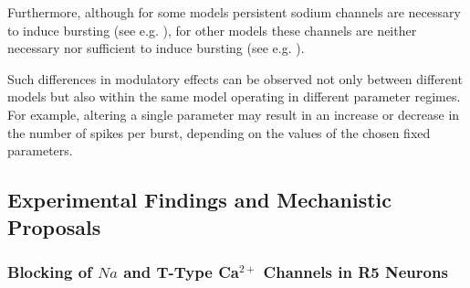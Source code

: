 \documentclass[../main.tex]{subfiles}
\begin{document}
Furthermore, although for some models persistent sodium channels are necessary to induce bursting (see e.g. \parencite{liuMultipleConductancesCooperatively2008,wangMultipleDynamicalModes1994}), for other models these channels are neither necessary nor sufficient to induce bursting (see e.g. \parencite{golombContributionPersistentNa2006}).

Such differences in modulatory effects can be observed not only between different models but also within the same model operating in different parameter regimes. For example, altering a single parameter may result in an increase or decrease in the number of spikes per burst, depending on the values of the chosen fixed parameters.










\subsection{Experimental Findings and Mechanistic Proposals} \label{subsec:experiments_and_proposals}

\subsubsection{\texorpdfstring{Blocking of $Na$ and T-Type Ca$^{2+}$ Channels in R5 Neurons}{Blocking of Na and T-Type Ca2+ Channels in R5 Neurons}} \label{subsubsec:experiment_ttx_t_type_block}
\end{document}
